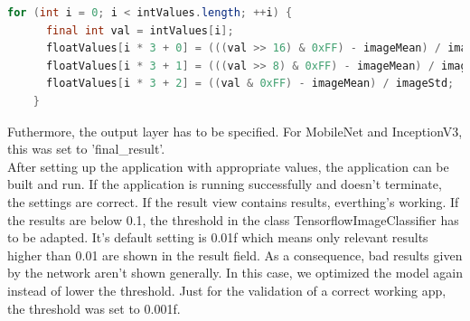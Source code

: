 \begin{lstlisting}[caption=Conversion of image data integer to float, label=list:int_conversion, language=java]
	for (int i = 0; i < intValues.length; ++i) {
      final int val = intValues[i];
      floatValues[i * 3 + 0] = (((val >> 16) & 0xFF) - imageMean) / imageStd;
      floatValues[i * 3 + 1] = (((val >> 8) & 0xFF) - imageMean) / imageStd;
      floatValues[i * 3 + 2] = ((val & 0xFF) - imageMean) / imageStd;
    }
\end{lstlisting}

Futhermore, the output layer has to be specified. For MobileNet and InceptionV3, this was set to 'final_result'. \\

After setting up the application with appropriate values, the application can be built and run. If the application is running successfully and doesn't terminate, the settings are correct. If the result view contains results, everthing's working. If the results are below 0.1, the threshold in the class TensorflowImageClassifier has to be adapted. It's default setting is 0.01f which means only relevant results higher than 0.01 are shown in the result field. As a consequence, bad results given by the network aren't shown generally. In this case, we optimized the model again instead of lower the threshold. Just for the validation of a correct working app, the threshold was set to 0.001f.